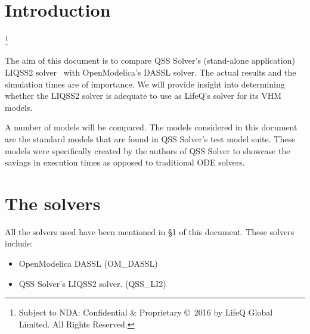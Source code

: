 \documentclass[10pt]{article}
\newcommand\blfootnote[1]{%
  \begingroup
  \renewcommand\thefootnote{}\footnote{#1}%
  \addtocounter{footnote}{-1}%
  \endgroup
}
\begin{document}
\newcommand{\bottomline}{\arrayrulecolor{white}\specialrule{\aboverulesep}{0pt}{0pt}%
	\arrayrulecolor{black}\specialrule{\heavyrulewidth}{0pt}{\belowbottomsep}}%

\newcommand{\bottomlinec}{\arrayrulecolor{tablerowcolor}\specialrule{\aboverulesep}{0pt}{0pt}%
	\arrayrulecolor{black}\specialrule{\heavyrulewidth}{0pt}{\belowbottomsep}}%

\newcommand{\bottomlinect}{\arrayrulecolor{tableheadcolor}\specialrule{\aboverulesep}{0pt}{0pt}%
	\arrayrulecolor{black}\specialrule{\heavyrulewidth}{0pt}{\belowbottomsep}}%



\maketitle



\pagestyle{myheadings}


\section{Introduction}

\blfootnote{Subject to NDA: Confidential \& Proprietary \copyright\ 2016 by LifeQ Global Limited. All Rights Reserved.}

The aim of this document is to compare QSS Solver's (stand-alone application) LIQSS2 solver~\cite{qss} with OpenModelica's DASSL solver. The actual results and the simulation times are of importance. We will provide insight into determining whether the LIQSS2 solver is adequate to use as LifeQ's solver for its VHM models.

A number of models will be compared. The models considered in this document are the standard models that are found in QSS Solver's test model suite. These models were specifically created by the authors of QSS Solver to showcase the savings in execution times as opposed to traditional ODE solvers.


\section{The solvers}

All the solvers used have been mentioned in \S1 of this document. These solvers include:
\begin{itemize}
 \item OpenModelica DASSL ({\sf OM\_DASSL})
 \item QSS Solver's LIQSS2 solver. ({\sf QSS\_LI2})
\end{itemize}
\end{document}
